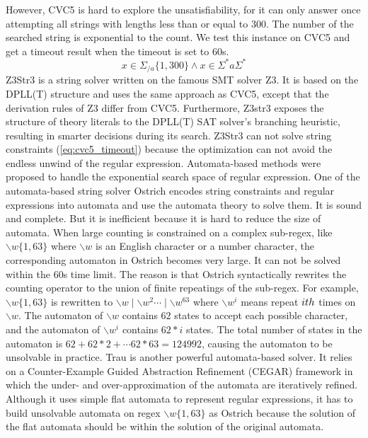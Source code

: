 {However, CVC5 is hard to explore the unsatisfiability, for it can only answer once attempting all strings with lengths less than or equal to 300. The number of the searched string is exponential to the count. We test this instance on CVC5 and get a timeout result when the timeout is set to 60s.
\begin{equation} \label{eq:cvc5_timeout}
  x\in \Sigma_{/a}\{1,300\}\wedge x\in \Sigma^*a\Sigma^*
\end{equation}
Z3Str3\cite{z3str3} is a string solver written on the famous SMT solver Z3\cite{Z3}. It is based on the DPLL(T) structure and uses the same approach as CVC5, except that the derivation rules of Z3 differ from CVC5. Furthermore, Z3str3 exposes the structure of theory literals to the DPLL(T) SAT solver's branching heuristic, resulting in smarter decisions during its search. Z3Str3 can not solve string constraints (\ref{eq:cvc5_timeout}) because the optimization can not avoid the endless unwind of the regular expression. Automata-based methods were proposed to handle the exponential search space of regular expression. One of the automata-based string solver Ostrich\cite{ostrich}\cite{atva2020} encodes string constraints and regular expressions into automata and use the automata theory to solve them. It is sound and complete. But it is inefficient because it is hard to reduce the size of automata. When large counting is constrained on a complex sub-regex, like $ \backslash w \{1, 63\}$ where $\backslash w$ is an English character or a number character, the corresponding automaton in Ostrich becomes very large. It can not be solved within the 60s time limit. The reason is that Ostrich syntactically rewrites the counting operator to the union of finite repeatings of the sub-regex. For example, $\backslash w\{1, 63\}$ is rewritten to $\backslash w\mid\backslash w^2\cdots\mid\backslash w^{63}$ where $\backslash w^i$ means repeat $i\-th$ times on $\backslash w$. The automaton of $\backslash w$ contains $62$ states to accept each possible character, and the automaton of $\backslash w ^i$ contains $62*i$ states. The total number of states in the automaton is $62 + 62*2 + \cdots 62*63=124992$, causing the automaton to be unsolvable in practice. Trau\cite{z3trau}\cite{trau+} is another powerful automata-based solver. It relies on a Counter-Example Guided Abstraction Refinement (CEGAR) framework in which the under- and over-approximation of the automata are iteratively refined. Although it uses simple flat automata to represent regular expressions, it has to build unsolvable automata on regex $\backslash w\{1, 63\}$ as Ostrich because the solution of the flat automata should be within the solution of the original automata. 
}
